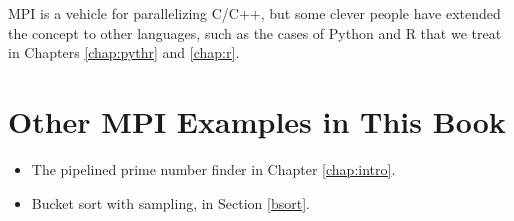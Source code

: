MPI is a vehicle for parallelizing C/C++, but some clever people have
extended the concept to other languages, such as the cases of Python and
R that we treat in Chapters \ref{chap:pythr} and \ref{chap:r}.

\section{Other MPI Examples in This Book}

\begin{itemize}

\item The pipelined prime number finder in Chapter \ref{chap:intro}.

\item Bucket sort with sampling, in Section \ref{bsort}.

\end{itemize}



